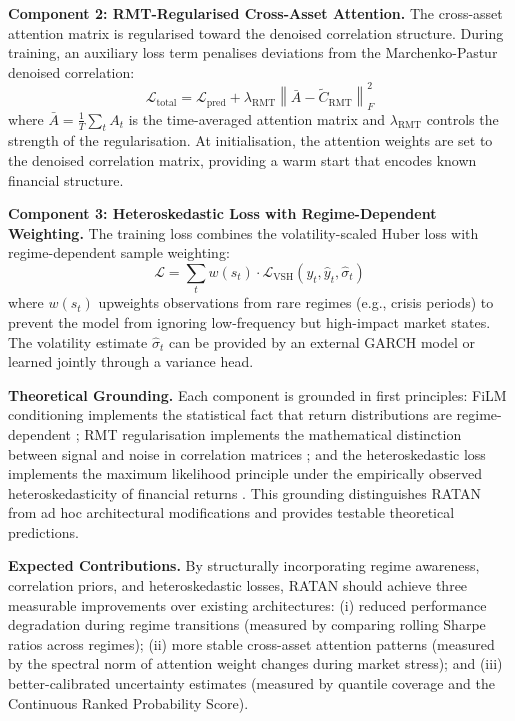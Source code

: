 \documentclass[conference]{IEEEtran}
\begin{document}
\textbf{Component 2: RMT-Regularised Cross-Asset Attention.} The cross-asset attention matrix is regularised toward the denoised correlation structure. During training, an auxiliary loss term penalises deviations from the Marchenko-Pastur denoised correlation:
\begin{equation}
\mathcal{L}_{\text{total}} = \mathcal{L}_{\text{pred}} + \lambda_{\text{RMT}} \left\| \bar{A} - \tilde{C}_{\text{RMT}} \right\|_F^2
\end{equation}
where $\bar{A} = \frac{1}{T} \sum_t A_t$ is the time-averaged attention matrix and $\lambda_{\text{RMT}}$ controls the strength of the regularisation. At initialisation, the attention weights are set to the denoised correlation matrix, providing a warm start that encodes known financial structure.

\textbf{Component 3: Heteroskedastic Loss with Regime-Dependent Weighting.} The training loss combines the volatility-scaled Huber loss with regime-dependent sample weighting:
\begin{equation}
\mathcal{L} = \sum_t w(s_t) \cdot \mathcal{L}_{\text{VSH}}(y_t, \hat{y}_t, \hat{\sigma}_t)
\end{equation}
where $w(s_t)$ upweights observations from rare regimes (e.g., crisis periods) to prevent the model from ignoring low-frequency but high-impact market states. The volatility estimate $\hat{\sigma}_t$ can be provided by an external GARCH model or learned jointly through a variance head.

\textbf{Theoretical Grounding.} Each component is grounded in first principles: FiLM conditioning implements the statistical fact that return distributions are regime-dependent \cite{hamilton1989new}; RMT regularisation implements the mathematical distinction between signal and noise in correlation matrices \cite{marchenko1967distribution}; and the heteroskedastic loss implements the maximum likelihood principle under the empirically observed heteroskedasticity of financial returns \cite{bollerslev1986generalized}. This grounding distinguishes RATAN from ad hoc architectural modifications and provides testable theoretical predictions.

\textbf{Expected Contributions.} By structurally incorporating regime awareness, correlation priors, and heteroskedastic losses, RATAN should achieve three measurable improvements over existing architectures: (i) reduced performance degradation during regime transitions (measured by comparing rolling Sharpe ratios across regimes); (ii) more stable cross-asset attention patterns (measured by the spectral norm of attention weight changes during market stress); and (iii) better-calibrated uncertainty estimates (measured by quantile coverage and the Continuous Ranked Probability Score).
\end{document}
